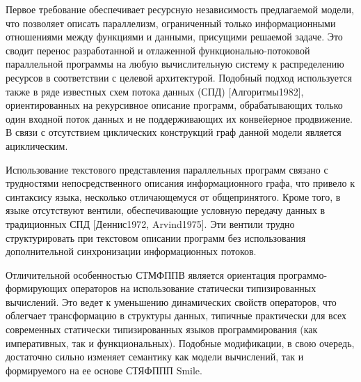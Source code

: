 
Первое требование обеспечивает ресурсную независимость предлагаемой модели, что позволяет описать параллелизм, ограниченный только информационными отношениями между функциями и данными, присущими решаемой задаче. Это сводит перенос разработанной и отлаженной функционально-потоковой параллельной программы на любую вычислительную систему к распределению ресурсов в соответствии с целевой архитектурой. Подобный подход используется также в ряде известных схем потока данных (СПД) [Алгоритмы1982], ориентированных на рекурсивное описание программ, обрабатывающих только один входной поток данных и не поддерживающих их конвейерное продвижение. В связи с отсутствием циклических конструкций граф данной модели является ациклическим.

Использование текстового представления параллельных программ связано с трудностями непосредственного описания информационного графа, что привело к синтаксису языка, несколько отличающемуся от общепринятого. Кроме того, в языке отсутствуют вентили, обеспечивающие условную передачу данных в традиционных СПД [Деннис1972, Arvind1975]. Эти вентили трудно структурировать при текстовом описании программ без использования дополнительной синхронизации информационных потоков.

Отличительной особенностью СТМФППВ является ориентация программо-формирующих операторов на использование статически типизированных вычислений. Это ведет к уменьшению динамических свойств операторов, что облегчает трансформацию в структуры данных, типичные практически для всех современных статически типизированных языков программирования (как императивных, так и функциональных). Подобные модификации, в свою очередь, достаточно сильно изменяет семантику как модели вычислений, так и формируемого на ее основе СТЯФППП Smile.


